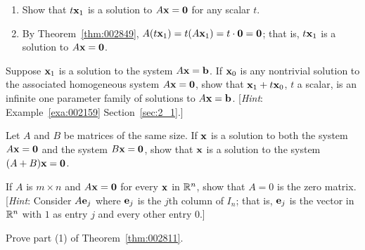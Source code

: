 \begin{multicols}{2}
\begin{ex}
\begin{enumerate}[label={\alph*.}]
\item Show that $t\textbf{x}_{1}$ is a solution to $A\textbf{x} = \textbf{0}$ for any scalar $t$.

\end{enumerate}
\begin{sol}
\begin{enumerate}[label={\alph*.}]
\setcounter{enumi}{1}
\item  By Theorem~\ref{thm:002849}, $A(t\textbf{x}_{1}) = t(A\textbf{x}_{1}) = t \cdot \textbf{0} = \textbf{0}$; that is, $t\textbf{x}_{1}$ is a solution to $A\textbf{x} = \textbf{0}$.

\end{enumerate}
\end{sol}
\end{ex}

\columnbreak
\begin{ex}
Suppose $\textbf{x}_{1}$ is a solution to the system $A\textbf{x} = \textbf{b}$. If $\textbf{x}_{0}$ is any nontrivial solution to the associated homogeneous system $A\textbf{x} = \textbf{0}$, show that $\textbf{x}_{1} + t\textbf{x}_{0}$, $t$ a scalar, is an infinite one parameter family of solutions to $A\textbf{x} = \textbf{b}$. [\textit{Hint}: Example~\ref{exa:002159} Section~\ref{sec:2_1}.]
\end{ex}

\begin{ex}
Let $A$ and $B$ be matrices of the same size. If $\textbf{x}$ is a solution to both the system $A\textbf{x} = \textbf{0}$ and the system $B\textbf{x} = \textbf{0}$, show that $\textbf{x}$ is a solution to the system $(A + B)\textbf{x} = \textbf{0}$.
\end{ex}

\begin{ex}
If $A$ is $m \times n$ and $A\textbf{x} = \textbf{0}$ for every $\textbf{x}$ in $\mathbb{R}^n$, show that $A = 0$ is the zero matrix. [\textit{Hint}: Consider $A\textbf{e}_{j}$ where $\textbf{e}_{j}$ is the $j$th column of $I_{n}$; that is, $\textbf{e}_{j}$ is the vector in $\mathbb{R}^n$ with $1$ as entry $j$ and every other entry $0$.]
\end{ex}

\begin{ex}
Prove part (1) of Theorem~\ref{thm:002811}.


\end{ex}
\end{multicols}
